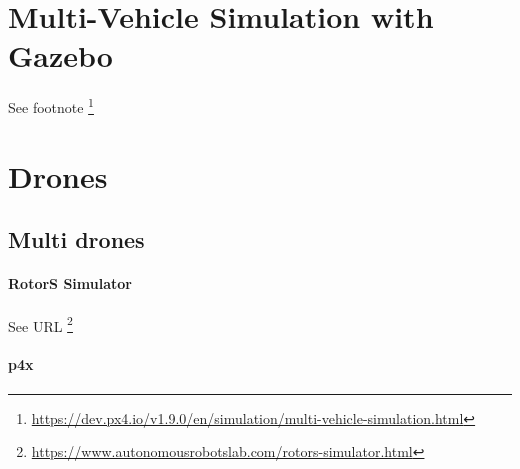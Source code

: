 \documentclass{article}
\begin{document}
	\section{Multi-Vehicle Simulation with Gazebo}
	See footnote \footnote{\url{https://dev.px4.io/v1.9.0/en/simulation/multi-vehicle-simulation.html}}
	
	\section{Drones}
		\subsection{Multi drones}
			\paragraph{RotorS Simulator} See URL \footnote{\url{https://www.autonomousrobotslab.com/rotors-simulator.html}}
			\paragraph{p4x} 
	
\end{document}
